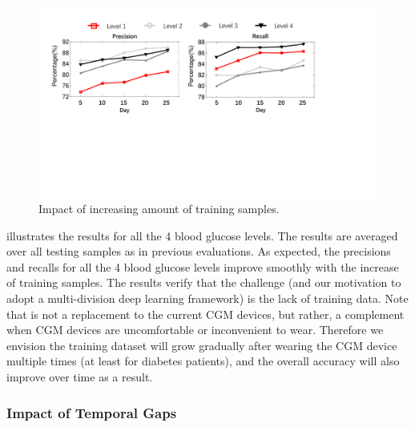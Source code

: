 \begin{figure}[h]
  \centering
  \includegraphics[width=0.8\columnwidth]{./img/performance_under_days1.pdf}
  \caption{Impact of increasing amount of training samples.}
  \label{fig:per_under_train_days}
\end{figure}

 illustrates the results for all the 4 blood glucose levels.
The results are averaged over all testing samples as in previous evaluations.
As expected, the precisions and recalls for all the 4 blood glucose levels improve smoothly with the increase of training samples.
The results verify that the challenge (and our motivation to adopt a multi-division deep learning framework) is the lack of training data.
Note that \sysname is not a replacement to the current CGM devices, but rather, a complement when CGM devices are uncomfortable or inconvenient to wear.
Therefore we envision the training dataset will grow gradually after wearing the CGM device multiple times (at least for diabetes patients), and the overall accuracy will also improve over time as a result.



\subsubsection{Impact of Temporal Gaps}
\label{subsubsec:gaps}


